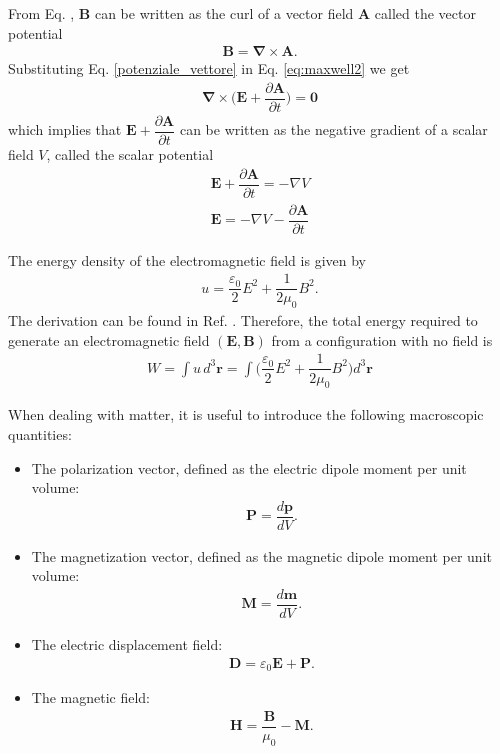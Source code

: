 \documentclass[12pt,a4paper,oneside,openany]{book}
\begin{document}
From Eq. , $\mathbf{B}$ can be written as the curl of a vector field $\mathbf{A}$ called the vector potential
\begin{align}
	\mathbf{B} = \boldsymbol{\nabla} \times \mathbf{A}.
	\label{potenziale_vettore}
\end{align}
Substituting Eq. \eqref{potenziale_vettore} in  Eq. \eqref{eq:maxwell2} we get
\begin{align}
	\boldsymbol{\nabla} \times \bigg( \mathbf{E} + \dfrac{\partial \mathbf{A}}{\partial t} \bigg) = \mathbf{0}
\end{align}
which implies that $\mathbf{E} + \dfrac{\partial \mathbf{A}}{\partial t}$ can be written as the negative gradient of a scalar field $V$, called the scalar potential
\begin{align*}
	\mathbf{E} + \dfrac{\partial \mathbf{A}}{\partial t} = - \nabla V
\end{align*}
\begin{align}
	\mathbf{E} = - \nabla V - \dfrac{\partial \mathbf{A}}{\partial t}
\end{align}

The energy density of the electromagnetic field is given by
\begin{align}
	u = \dfrac{\varepsilon_0}{2} E^2 + \dfrac{1}{2 \mu_0} B^2 .
\end{align}
The derivation can be found in Ref. \cite{Griffiths}. Therefore, the total energy required to generate an electromagnetic field $(\mathbf{E}, \mathbf{B})$ from a configuration with no field is
\begin{align}
	W = \int u \, d^3\mathbf{r} = \int \bigg( \dfrac{\varepsilon_0}{2} E^2 + \dfrac{1}{2 \mu_0} B^2 \bigg) d^3\mathbf{r}
	\label{energia_EM}
\end{align}

When dealing with matter, it is useful to introduce the following macroscopic quantities:
\begin{itemize}
\item{The polarization vector, defined as the electric dipole moment per unit volume:
\begin{align}
	\mathbf{P} = \dfrac{d\mathbf{p}}{dV}.
\end{align}}
\item{The magnetization vector, defined as the magnetic dipole moment per unit volume:
\begin{align}
	\mathbf{M} = \dfrac{d\mathbf{m}}{dV}.
\end{align}}
\item{The electric displacement field:
\begin{align}
	\mathbf{D} = \varepsilon_0 \mathbf{E} + \mathbf{P}.
\end{align}}
\item{The magnetic field:
\begin{align}
	\mathbf{H} = \dfrac{\mathbf{B}}{\mu_0} - \mathbf{M}.
	\label{Campo_magnetico}
\end{align}}
\end{itemize}
\end{document}
